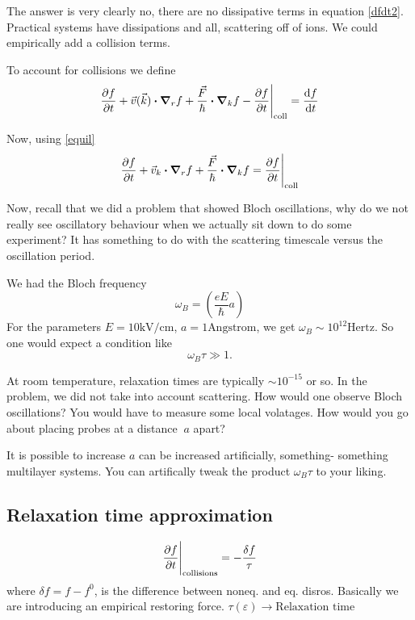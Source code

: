 \documentclass[a4paper]{article}
\begin{document}
The answer is very clearly no, there are no dissipative terms in
equation \ref{dfdt2}. Practical systems have dissipations and all,
scattering off of ions. We could empirically add a collision terms.

To account for collisions we define
\begin{equation}
	\pdv{f}{t} + \vec{v}(\vec{k})\vdot\grad_rf + \frac{\vec{F}}{\hbar}\vdot\grad_k f - \pdv{f}{t}\Bigg|_\text{coll} = \frac{\dd f}{\dd t} 
\end{equation}

Now, using \ref{equil}
\begin{equation}
	\pdv{f}{t} + \vec{v}_k\vdot\grad_rf + \frac{\vec{F}}{\hbar}\vdot\grad_kf = \pdv{f}{t}\Bigg|_\text{coll}
\end{equation}

Now, recall that we did a problem that showed Bloch oscillations,
why do we not really see oscillatory behaviour when we actually sit
down to do some experiment? It has something to do with the scattering
timescale versus the oscillation period.

We had the Bloch frequency
\begin{equation}
	\omega_B = \left( \frac{eE}{\hbar} a\right) 
\end{equation}
For the parameters $E = 10\text{kV/cm}$,  $a = 1\text{Angstrom}$, we
get  $\omega_B \sim 10^{12} \text{Hertz}$. So one would expect a
condition like
\[
\omega_B \tau \gg 1
.\] 

At room temperature, relaxation times are typically $\sim 10^{-15}$
or so. In the problem, we did not take into account scattering.
How would one observe Bloch oscillations? You would have to measure
some local volatages. How would you go about placing probes at a
distance $~a$ apart?

It is possible to increase  $a$ can be increased artificially, something-
something multilayer systems. You can artifically tweak the product
$\omega_B \tau$ to your liking.

\subsection*{Relaxation time approximation}
\begin{equation}
	\pdv{f}{t}\Bigg|_\text{collisions} = -\frac{\delta f}{\tau}
\end{equation}
where $\delta f = f - f^{0}$, is the difference between noneq. and 
eq. disros. Basically we are introducing an empirical restoring force. $\tau(\varepsilon) \to \text{Relaxation time}$
\end{document}
